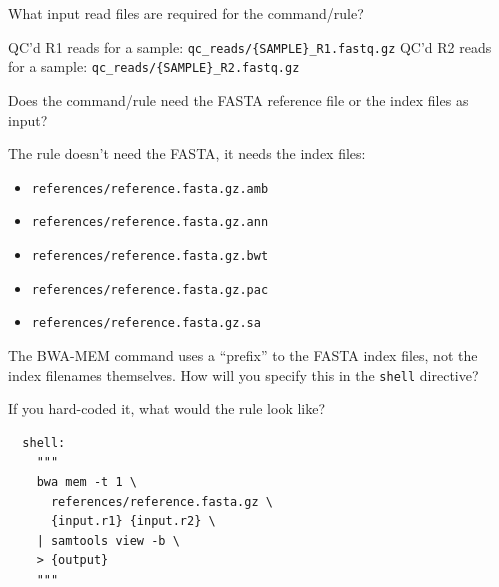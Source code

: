 \begin{questions}

What input read files are required for the command/rule?

\begin{answer}

QC'd R1 reads for a sample: \texttt{qc\_reads/\{SAMPLE\}\_R1.fastq.gz}
QC'd R2 reads for a sample: \texttt{qc\_reads/\{SAMPLE\}\_R2.fastq.gz}

\end{answer}

Does the command/rule need the FASTA reference file or the index files as input?

\begin{answer}

The rule doesn't need the FASTA, it needs the index files:

\begin{itemize}
  \item \texttt{references/reference.fasta.gz.amb}
  \item \texttt{references/reference.fasta.gz.ann}
  \item \texttt{references/reference.fasta.gz.bwt}
  \item \texttt{references/reference.fasta.gz.pac}
  \item \texttt{references/reference.fasta.gz.sa}
\end{itemize}

\end{answer}

The BWA-MEM command uses a ``prefix'' to the FASTA index files, not the index filenames themselves.
How will you specify this in the \texttt{shell} directive?

If you hard-coded it, what would the rule look like?

\begin{answer}

\begin{lstlisting}
  shell:
    """
    bwa mem -t 1 \
      references/reference.fasta.gz \
      {input.r1} {input.r2} \
    | samtools view -b \
    > {output}
    """
\end{lstlisting}

\end{answer}

\end{questions}

